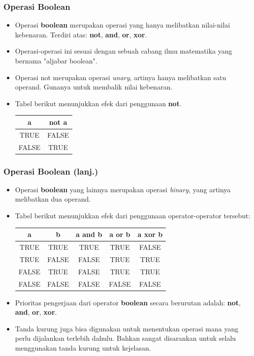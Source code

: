 \documentclass{beamer}
\begin{document}
\begin{frame}
\frametitle{Operasi Boolean}
\begin{itemize}
	\item Operasi \textbf{boolean} merupakan operasi yang hanya melibatkan nilai-nilai kebenaran. Terdiri atas: \textbf{not}, \textbf{and}, \textbf{or}, \textbf{xor}.
	\item Operasi-operasi ini sesuai dengan sebuah cabang ilmu matematika yang bernama "aljabar boolean".
	\item Operasi \alert{not} merupakan operasi \textit{unary}, artinya hanya melibatkan satu operand. Gunanya untuk membalik nilai kebenaran.
	\item Tabel berikut menunjukkan efek dari penggunaan \textbf{not}.
	\begin{tabular}{|c|c|}
	\hline a & not a \\ 
	\hline TRUE & FALSE \\ 
	\hline FALSE & TRUE \\ 
	\hline 
	\end{tabular} 
\end{itemize}
\end{frame}

\begin{frame}
\frametitle{Operasi Boolean (lanj.)}
\begin{itemize}
	\item Operasi \textbf{boolean} yang lainnya merupakan operasi \textit{binary}, yang artinya melibatkan dua operand.
	\item Tabel berikut menunjukkan efek dari penggunaan operator-operator tersebut:
	\begin{tabular}{|c|c|c|c|c|}
	\hline a & b & a and b & a or b & a xor b \\ 
	\hline TRUE & TRUE & TRUE & TRUE & FALSE \\ 
	\hline TRUE & FALSE & FALSE & TRUE & TRUE \\ 
	\hline FALSE & TRUE & FALSE & TRUE & TRUE\\ 
	\hline FALSE & FALSE & FALSE & FALSE & FALSE \\ 
	\hline 
	\end{tabular} 
	\item Prioritas pengerjaan dari operator \textbf{boolean} secara berurutan adalah: \textbf{not}, \textbf{and}, \textbf{or}, \textbf{xor}.
	\item Tanda kurung juga bisa digunakan untuk menentukan operasi mana yang perlu dijalankan terlebih dahulu. Bahkan sangat disarankan untuk selalu menggunakan tanda kurung untuk kejelasan.
\end{itemize}
\end{frame}
\end{document}
